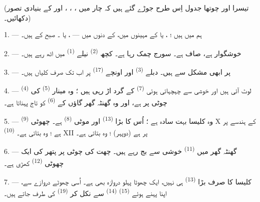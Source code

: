 \VUsaut{3.0mm}
\VUsaut{1.6mm}
\VUsaut{3.4mm}

(تیسرا اور چوتھا جدول اِس طرح جوڑے گئے ہیں کہ چار  میں ، ، ،
 اور  کے بنیادی تصور دکھائیں۔)

\VUsaut{4.0mm}
\VUsaut{3.0mm}

\VUsaut{2.4mm}

\VUsaut{3.0mm}

1. --- ہم  میں ہیں ؛ ،  یا
 کے مہینوں میں،  کے دنوں میں —
،  یا ۔ صبح کے 
ہیں۔

2. ---  خوشگوار ہے،  صاف ہے۔ سورج چمک رہا
ہے۔ کچھ  \textsuperscript{(2)} نیلے
 \textsuperscript{(1)} میں اٹھ رہے ہیں۔

3. ---  پر ابھی مشکل سے  ہیں۔ دبلے
 \textsuperscript{(3)} اور اونچے 
\textsuperscript{(17)} پر اب تک صرف کلیاں ہیں۔

4. ---  \textsuperscript{(4)} لوٹ آئی ہیں اور خوشی سے
چہچہاتی ہوئی  \textsuperscript{(7)} کے گرد اڑ رہی
ہیں ؛ وہ مینار  \textsuperscript{(5)} کی چوٹی پر ہے،
اور وہ گھنٹہ گھر گاؤں کے  \textsuperscript{(6)} کو تاج
پہناتا ہے۔

\VUsaut{3.4mm}
\VUsaut{3.0mm}

5. --- وہ کلیسا بہت سادہ ہے ؛ اُس کا بڑا 
\textsuperscript{(13)} اور موٹی  \textsuperscript{(8)}
ہے۔ چھوٹی  \textsuperscript{(9)} X کے ہندسے پر ہے ؛ وہ
 بتاتی ہے۔  \textsuperscript{(10)} XII
پر ہے (دوپہر) ؛ وہ  بتاتی ہے۔

6. --- گھنٹہ گھر میں  \textsuperscript{(11)} خوشی سے بج
رہے ہیں۔ چھت کی چوٹی پر پتھر کی ایک چھوٹی 
\textsuperscript{(12)} کھڑی ہے۔

7. --- کلیسا کا صرف بڑا  \textsuperscript{(13)} ہی
نہیں، ایک چھوٹا پہلو دروازہ بھی ہے۔ اُسی چھوٹے دروازے سے، اپنا
 پہنے ہوئے  \textsuperscript{(15)}
 \textsuperscript{(14)} سے نکل کر  \textsuperscript{(19)} کی طرف جاتے ہیں۔

